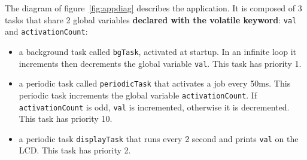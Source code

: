 \documentclass[11pt]{report}
\begin{document}
The diagram of figure~\ref{fig:appdiag} describes the application.
It is composed of 3 tasks that share 2 global variables {\bf declared with the volatile keyword}: \texttt{val} and \texttt{activationCount}:
\begin{itemize}
\item a background task called \texttt{bgTask}, activated at startup. In an infinite loop it increments then decrements the global variable \texttt{val}. This task has priority 1.
\item a periodic task called \texttt{periodicTask} that activates a job every 50ms. This periodic task increments the global variable \texttt{activationCount}. If \texttt{activationCount} is odd, \texttt{val} is incremented, otherwise it is decremented. This task has priority 10.
\item a periodic task \texttt{displayTask} that runs every 2 second and prints \texttt{val} on the LCD. This task has priority 2.
\end{itemize}

\def\alarm#1#2{
  \node[alarm](#1) [#2] {};
  \coordinate (a) at ($(#1.north)$);
  \coordinate (b) at ($(#1.north east)$);
  \coordinate (c) at ($(#1.north west)$);
  \coordinate (d) at ($(#1)$);
  \draw[thick] ($(a)+(-0.1,0)$) rectangle ($(a)+(0.1,0.1)$);
  \draw[rotate=-45,thick] ($(b)+(-0.05,0)$) rectangle ($(b)+(0.05,0.1)$);
  \draw[rotate=45,thick] ($(c)+(-0.05,0)$) rectangle ($(c)+(0.05,0.1)$);
  \draw ($(d)+(0.3,0)$) -- (d) -- ($(d)+(0,0.3)$);
  \node [font=\scriptsize,below=0.5mm of #1] {{\em Alarm}}
}

\def\sharedvar#1#2#3{
  \node (#1) [#2] {#1};
  \coordinate (a) at ($(#1.north #3) + (0,0.2)$);
  \coordinate (b) at ($(#1.south #3) + (0,-0.2)$);
  \draw[ultra thick] (a) -- (b);
  \draw ($(a)+(-0.1,0)$) -- ($(a)+(0.1,0)$);
  \draw ($(b)+(-0.1,0)$) -- ($(b)+(0.1,0)$)
}

\def\varrect#1{
  \draw ($(#1.south west)$) rectangle ($(#1.north east)$)
}
\end{document}
